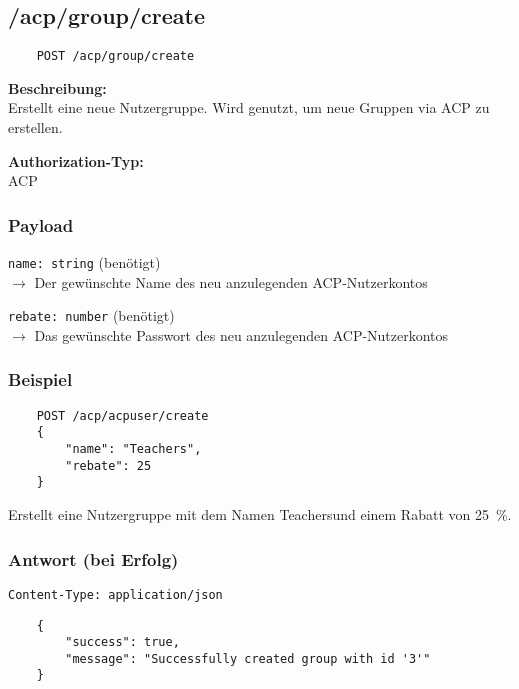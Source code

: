 \subsection{/acp/group/create}

\begin{lstlisting}
    POST /acp/group/create
\end{lstlisting}

\textbf{Beschreibung:} \\
Erstellt eine neue Nutzergruppe. Wird genutzt, um neue Gruppen via ACP zu erstellen.

\textbf{Authorization-Typ:} \\
ACP

\subsubsection{Payload}

\lstinline{name: string} (benötigt) \\
$\rightarrow$ Der gewünschte Name des neu anzulegenden ACP-Nutzerkontos

\lstinline{rebate: number} (benötigt) \\
$\rightarrow$ Das gewünschte Passwort des neu anzulegenden ACP-Nutzerkontos

\subsubsection{Beispiel}

\begin{lstlisting}
    POST /acp/acpuser/create
    {
        "name": "Teachers",
        "rebate": 25
    }
\end{lstlisting}

Erstellt eine Nutzergruppe mit dem Namen \glqq Teachers\grqq und einem Rabatt von \SI{25}{\percent}.

\subsubsection{Antwort (bei Erfolg)}

\lstinline{Content-Type: application/json}
\begin{lstlisting}
    {
        "success": true, 
        "message": "Successfully created group with id '3'"
    }
\end{lstlisting}